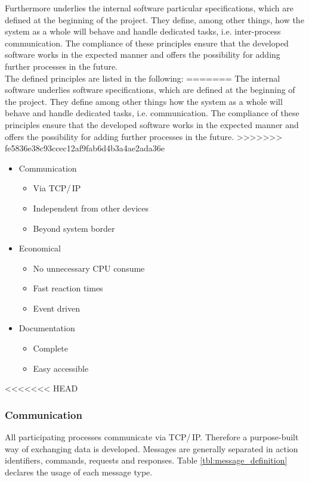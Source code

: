 Furthermore underlies the internal software particular specifications, which are defined at the beginning of the project. They define, among other things, how the system as a whole will behave and handle dedicated tasks, i.e. inter-process communication. The compliance of these principles ensure that the developed software works in the expected manner and offers the possibility for adding further processes in the future.\\

The defined principles are listed in the following:
=======
The internal software underlies software specifications, which are defined at the beginning of the project. They define among other things how the system as a whole will behave and handle dedicated tasks, i.e. communication. The compliance of these principles ensure that the developed software works in the expected manner and offers the possibility for adding further processes in the future.
>>>>>>> fe5836e38c93ccec12af9fab6d4b3a4ae2ada36e

\begin{itemize}
\itemsep0em
\item Communication
	\begin{itemize}
	\item Via TCP/\,IP
	\item Independent from other devices
	\item Beyond system border
	\end{itemize}
	
\item Economical
	\begin{itemize}
	\item No unnecessary CPU consume
	\item Fast reaction times
	\item Event driven
	\end{itemize}
	
\item Documentation
	\begin{itemize}
	\item Complete
	\item Easy accessible
	\end{itemize}
\end{itemize}

<<<<<<< HEAD
\subsubsection{Communication}

All participating processes communicate via TCP/\,IP. Therefore a purpose-built way of exchanging data is developed. Messages are generally separated in action identifiers, commands, requests and responses. Table \ref{tbl:message_definition} declares the usage of each message type.\\ 

